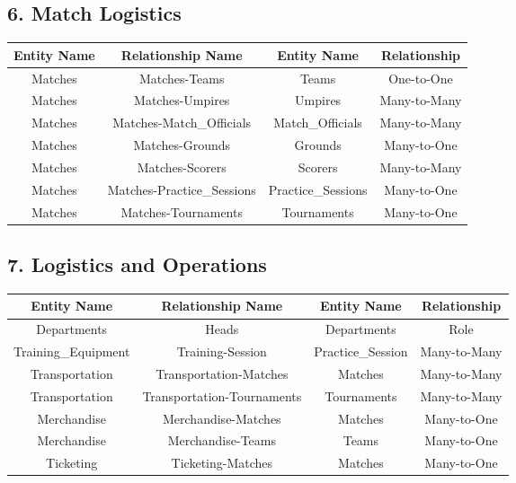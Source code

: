 \documentclass[a4paper, 12pt]{article}
\begin{document}
\subsection{6. Match Logistics}
\begin{tabular}{|C|C|C|C|}
\hline
    \textbf{Entity Name} &\textbf{Relationship Name} & \textbf{Entity Name} & \textbf{Relationship}\\\hline
         Matches & Matches-Teams & Teams & One-to-One \\\hline
         Matches & Matches-Umpires & Umpires & Many-to-Many\\\hline
         Matches & Matches-Match\_Officials & Match\_Officials & Many-to-Many\\\hline
         Matches & Matches-Grounds & Grounds & Many-to-One\\\hline
         Matches & Matches-Scorers & Scorers & Many-to-Many\\\hline
         Matches & Matches-Practice\_Sessions & Practice\_Sessions & Many-to-One\\\hline
         Matches & Matches-Tournaments & Tournaments & Many-to-One\\
\hline
\end{tabular}
\newline

\subsection{7. Logistics and Operations}
\begin{tabular}{|C|C|C|C|}
\hline
    \textbf{Entity Name} &\textbf{Relationship Name} & \textbf{Entity Name} & \textbf{Relationship}\\\hline
         Departments & Heads & Departments & Role\\\hline
         Training\_Equipment & Training-Session & Practice\_Session & Many-to-Many\\\hline
         Transportation & Transportation-Matches & Matches & Many-to-Many\\\hline
         Transportation & Transportation-Tournaments & Tournaments & Many-to-Many\\\hline
         Merchandise & Merchandise-Matches & Matches & Many-to-One\\\hline
         Merchandise & Merchandise-Teams & Teams & Many-to-One\\\hline
         Ticketing  & Ticketing-Matches & Matches & Many-to-One\\
\hline
\end{tabular}
\newline
\end{document}
